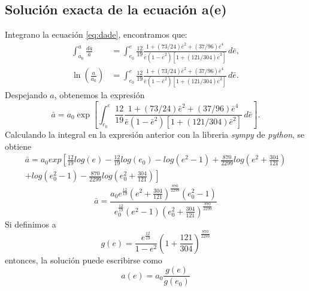 \subsection{Solución exacta de la ecuación a(e)}
Integrano la ecuación \ref{eq:dade}, encontramos que:
\begin{align*}
    \int_{a_{0}}^{a}\frac{d\bar{a}}{\bar{a}}&=\int_{e_{0}}^{e}\frac{12}{19}\frac{1+(73/24)\bar{e}^2+(37/96)\bar{e}^4}{\bar{e}(1-\bar{e}^2)[1+(121/304)\bar{e}^2]}\,d\bar{e},\\
    \ln \left(\frac{a}{a_{0}}\right)&=\int_{e_{0}}^{e}\frac{12}{19}\frac{1+(73/24)\bar{e}^2+(37/96)\bar{e}^4}{\bar{e}(1-\bar{e}^2)[1+(121/304)\bar{e}^2]}\,d\bar{e}.
\end{align*}
Despejando $a$, obtenemos la expresión
\begin{equation}
    \bar{a}= a_{0}\exp\left[\int_{e_{0}}^{e}\frac{12}{19}\frac{1+(73/24)\bar{e}^2+(37/96)\bar{e}^4}{\bar{e}(1-\bar{e}^2)[1+(121/304)\bar{e}^2]}\,d\bar{e}\right].
    \label{eq:bara}
\end{equation}
Calculando la integral en la expresión anterior con la libreria \textit{sympy} de \textit{python}, se obtiene
\begin{eqnarray*}
        \bar{a}=a_0exp\left[\frac{12}{19}log(e)-\frac{12}{19}log(e_0)-log(e^2-1)+\frac{870}{2299}log\left(e^2+\frac{304}{121}\right)\right.\\
        \left.+log\left(e^2_0-1\right)-\frac{870}{2299}log\left(e^2_0+\frac{304}{121}\right)\right]
\end{eqnarray*}
\begin{equation}
    \bar{a}= \frac{a_0e^{\frac{12}{19}}\left(e^2+\frac{304}{121}\right)^{\frac{870}{2299}}\left(e^2_0-1\right)}{e^{\frac{12}{19}}_0\left(e^2-1\right)\left(e_0^2+\frac{304}{121}\right)^{\frac{870}{2299}}}
\end{equation}
Si definimos a 
\begin{equation}
    g(e)= \frac{e^{\frac{12}{19}}}{1-e^2} \left(1+\frac{121}{304}\right)^{\frac{870}{2299}}
    \label{eq:g(e)}
\end{equation}
entonces, la solución puede escribirse como 
\begin{equation}
    a(e)= a_0\frac{g(e)}{g(e_0)}
    \label{eq:a(e)}
\end{equation}
